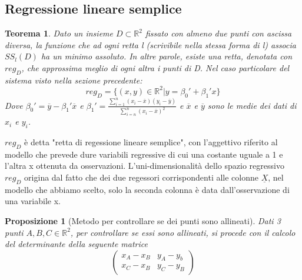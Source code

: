 \documentclass[12pt]{article}
\newenvironment{para}{\begin{adjustwidth}{13mm}{}}{\end{adjustwidth}}
\newtheorem{Teorema}{Teorema}[subsection]
\newtheorem{Proposizione}{Proposizione}[subsection]
\begin{document}
\begin{para}
\subsection{Regressione lineare semplice}
\begin{Teorema}
    Dato un insieme $D \subset \mathbb{R}^2$ fissato con almeno due punti con ascissa diversa, la funzione che ad ogni retta l (scrivibile nella stessa forma di l) associa $SS_l(D)$ ha un minimo assoluto. In altre parole, esiste una retta, denotata con $reg_D$, che approssima meglio di ogni altra i punti di D. Nel caso particolare del sistema visto nella sezione precedente:
    $$reg_D = \{(x,y)\in \mathbb{R}^2 | y=\beta_0'+\beta_1'x\}$$
    Dove $\beta_0' = \overline{y}-\beta_1'\overline{x}$ e $\beta_1' = \frac{\sum_{i=1}^n(x_i-\overline{x})(y_i-\overline{y})}{\sum_{i=n}^n(x_i-\overline{x})^2}$ e $\overline{x}$ e $\overline{y}$ sono le medie dei dati di $x_i$ e $y_i$.
\end{Teorema}
$reg_D$ è detta "retta di regessione lineare semplice", con l'aggettivo riferito al modello che prevede dure variabili regressive di cui una costante uguale a 1 e l'altra x ottenuta da osservazioni. L'uni-dimensionalità dello spazio regressivo $reg_D$ origina dal fatto che dei due regessori corrispondenti alle colonne $\underline{X}$, nel modello che abbiamo scelto, solo la seconda colonna è data dall'osservazione di una variabile x.
\begin{Proposizione}[Metodo per controllare se dei punti sono allineati]
Dati 3 punti $A,B,C \in \mathbb{R}^2$, per controllare se essi sono allineati, si procede con il calcolo del determinante della seguente matrice $$\begin{pmatrix}
    x_A-x_B & y_A-y_b \\
    x_C-x_B & y_C-y_B
\end{pmatrix}$$
\end{Proposizione}

\end{para}
\end{document}
